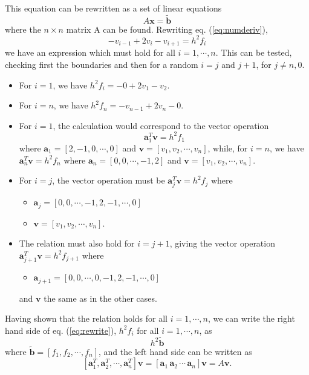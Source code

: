 \documentclass[a4paper,11pt]{article}
\begin{document}
    This equation can be rewritten as a set of linear equations
    \[ A\mathbf{x} = \tilde{\mathbf{b}} \]
    where the $n\times n$ matrix A can be found. Rewriting eq. (\ref{eq:numderiv}),
    \begin{equation}
        -v_{i-1} + 2v_i -v_{i+1} = h^2 f_i
        \label{eq:rewrite}
    \end{equation}
    we have an expression which must hold for all $i=1,\cdots,n$. This can be tested, checking first the boundaries and then for a random $i=j$ and $j+1$, for $j\neq n,0$.

    \begin{itemize}
        \item For $i=1$, we have $h^2 f_i = -0 + 2v_1 -v_2$.

        \item For $i=n$, we have $h^2 f_n = -v_{n-1} + 2v_n -0 $.

        \item For $i=1$, the calculation would correspond to the vector operation
    \[ \mathbf{a}_1^T \mathbf{v} = h^2 f_1 \]
    where $\mathbf{a}_1 = [2,-1,0,\cdots,0]$ and $\mathbf{v} = [v_1, v_2, \cdots, v_n ]$, while, for $i=n$, we have  $\mathbf{a}_n^T \mathbf{v} = h^2 f_n$ where $\mathbf{a}_n = [0,0,\cdots,-1,2]$ and $\mathbf{v} = [v_1, v_2, \cdots, v_n ]$.

        \item For $i=j$, the vector operation must be $  \mathbf{a}_j^T \mathbf{v} = h^2 f_j$  where
            \begin{itemize}
                \item $\mathbf{a}_j = [0,0,\cdots,-1,2,-1,\cdots,0]$
                \item $\mathbf{v}   = [v_1,v_2,\cdots,v_n]$.
            \end{itemize}
        \item The relation must also hold for $i=j+1$, giving the vector operation $\mathbf{a}_{j+1}^T \mathbf{v} = h^2 f_{j+1}$ where
            \begin{itemize}
                \item $\mathbf{a}_{j+1} = [0,0,\cdots,0,-1,2,-1,\cdots,0]$
            \end{itemize}
            and $\mathbf{v}$ the same as in the other cases. 
    \end{itemize}

    Having shown that the relation holds for all $i=1,\cdots,n$, we can write the right hand side of eq. (\ref{eq:rewrite}), $h^2 f_i$ for all $i=1,\cdots,n$, as 
    \[ h^2\tilde{\mathbf{b}} \]
    where $\tilde{\mathbf{b}} = [f_1,f_2,\cdots,f_n]$, and the left hand side can be written as 
    \[ [\mathbf{a}_1^T,\mathbf{a}_2^T,\cdots,\mathbf{a}_n^T] \mathbf{v} = [\mathbf{a}_1\,\mathbf{a}_2 \, \cdots \, \mathbf{a}_n] \mathbf{v} = A\mathbf{v}. \]
\end{document}

